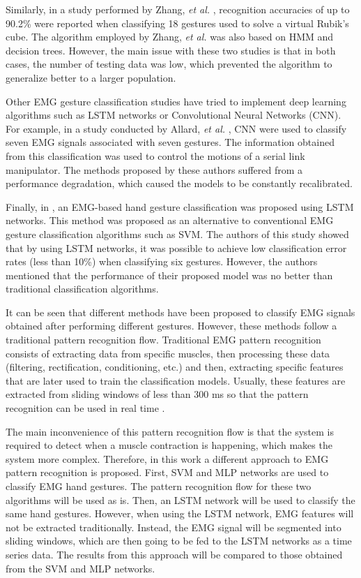 \documentclass[journal]{IEEEtran}
\newcommand{\etal}{\emph{et al.}}
\begin{document}
	Similarly, in a study performed by Zhang, \etal{} \cite{zhang2011}, recognition accuracies of up to 90.2\% were reported when classifying 18 gestures used to solve a virtual Rubik’s cube. The algorithm employed by Zhang, \etal{} was also based on HMM and decision trees. However, the main issue with these two studies is that in both cases, the number of testing data was low, which prevented the algorithm to generalize better to a larger population. 
	
	Other EMG gesture classification studies have tried to implement deep learning algorithms such as LSTM networks or Convolutional Neural Networks (CNN). For example, in a study conducted by Allard, \etal{} \cite{allard2016}, CNN were used to classify seven EMG signals associated with seven gestures. The information obtained from this classification was used to control the motions of a serial link manipulator. The methods proposed by these authors suffered from a performance degradation, which caused the models to be constantly recalibrated. 
	
	Finally, in \cite{jabbari2020}, an EMG-based hand gesture classification was proposed using LSTM networks. This method was proposed as an alternative to conventional EMG gesture classification algorithms such as SVM. The authors of this study showed that by using LSTM networks, it was possible to achieve low classification error rates (less than 10\%) when classifying six gestures. However, the authors mentioned that the performance of their proposed model was no better than traditional classification algorithms.
	
	It can be seen that different methods have been proposed to classify EMG signals obtained after performing different gestures. However, these methods follow a traditional pattern recognition flow. Traditional EMG pattern recognition consists of extracting data from specific muscles, then processing these data (filtering, rectification, conditioning, etc.) and then, extracting specific features that are later used to train the classification models. Usually, these features are extracted from sliding windows of less than 300 ms so that the pattern recognition can be used in real time \cite{englehart2003}. 
	
	The main inconvenience of this pattern recognition flow is that the system is required to detect when a muscle contraction is happening, which makes the system more complex. Therefore, in this work a different approach to EMG pattern recognition is proposed. First, SVM and MLP networks are used to classify EMG hand gestures. The pattern recognition flow for these two algorithms will be used as is. Then, an LSTM network will be used to classify the same hand gestures. However, when using the LSTM network, EMG features will not be extracted traditionally. Instead, the EMG signal will be segmented into sliding windows, which are then going to be fed to the LSTM networks as a time series data. The results from this approach will be compared to those obtained from the SVM and MLP networks.
	
\end{document}
